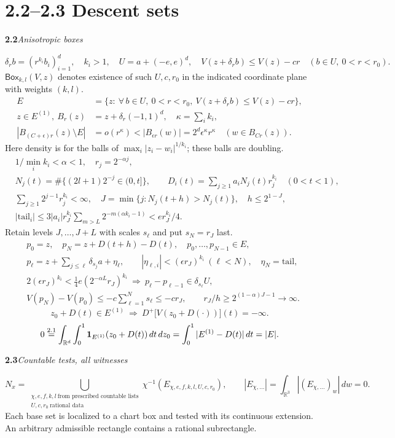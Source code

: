 \documentclass[11pt]{article}
\newcommand{\R}{\mathbb R}
\newcommand{\boxd}{\mathsf{Box}}
\newcommand{\rowhead}[2]{\par\medskip\noindent\textbf{#1}\quad\textit{#2}\par}
\newcommand{\newpart}[1]{\clearpage\section*{#1}}
\begin{document}
\newpart{2.2--2.3 \quad Descent sets}
\rowhead{2.2}{Anisotropic boxes}
\[
 \delta_r b=(r^{k_i}b_i)_{i=1}^d,\quad k_i>1,\quad
 U=a+(-e,e)^d,\quad V(z+\delta_r b)\le V(z)-cr\quad(b\in U,\ 0<r<r_0).
\]
$\boxd_{k,l}(V,z)$ denotes existence of such $U,c,r_0$ in the indicated
coordinate plane with weights $(k,l)$.
\begin{align*}
 E&=\{z:\ \forall\, b\in U,\ 0<r<r_0,\ V(z+\delta_r b)\le V(z)-cr\},\\
 z\in E^{(1)},\ B_r(z)&=z+\delta_r(-1,1)^d,\quad \kappa=\textstyle\sum_i k_i,\\
 |B_{(C+\epsilon)r}(z)\setminus E|&=o(r^\kappa)
     < |B_{\epsilon r}(w)|=2^d\epsilon^\kappa r^\kappa
                \quad(w\in B_{Cr}(z)).
\end{align*}
Here density is for the balls of $\max_i |z_i-w_i|^{1/k_i}$; these balls are doubling.
\begin{align*}
 &1/\min_i k_i<\alpha<1,\quad r_j=2^{-\alpha j},\\
 &N_j(t)=\#\{(2l+1)2^{-j}\in(0,t]\},\qquad
 D_i(t)=\sum_{j\ge1} a_i N_j(t)r_j^{k_i}\quad (0<t<1),\\
 &\sum_{j\ge1}2^{j-1}r_j^{k_i}<\infty,\quad
 J=\min\{j:N_j(t+h)>N_j(t)\},\quad h\le 2^{1-J},\\
 &|\mathrm{tail}_i|\le
  3|a_i|r_J^{k_i}\sum_{m>L}2^{-m(\alpha k_i-1)}< e r_J^{k_i}/4 .
\end{align*}
Retain levels $J,\ldots,J+L$ with scales $s_\ell$ and put $s_N=r_J$ last.
\begin{align*}
 &p_0=z,\quad p_N=z+D(t+h)-D(t),\quad p_0,\ldots,p_{N-1}\in E,\\
 &p_\ell=z+\sum_{j\le\ell}\delta_{s_j}a+\eta_\ell,\qquad
 |\eta_{\ell,i}|<(\epsilon r_J)^{k_i}\ (\ell<N),\quad \eta_N=\mathrm{tail},\\
 &2(\epsilon r_J)^{k_i}<\tfrac14 e(2^{-\alpha L}r_J)^{k_i}
 \ \Longrightarrow\ p_\ell-p_{\ell-1}\in\delta_{s_\ell}U,\\
 &V(p_N)-V(p_0)\le-c\sum_{\ell=1}^N s_\ell\le-c r_J,\qquad
 r_J/h\ge 2^{(1-\alpha)J-1}\to\infty .
\end{align*}
\[
 z_0+D(t)\in E^{(1)}\ \Longrightarrow\
 D^+\big[V(z_0+D(\cdot))\big](t)=-\infty .
\]
\[
 0\overset{2.1}{=}\int_{\R^d}\int_0^1 {\bf1}_{E^{(1)}}(z_0+D(t))\,dt\,dz_0
  =\int_0^1 |E^{(1)}-D(t)|\,dt=|E| .
\]
\rowhead{2.3}{Countable tests, all witnesses}
\[
  N_x=\bigcup_{\substack{\chi,e,f,k,l\ \text{from prescribed countable lists}\\
                          U,c,r_0\ \text{rational data}}}
         \chi^{-1}(E_{\chi,e,f,k,l,U,c,r_0}),\qquad
 |E_{\chi,\ldots}|=\int_{\R^3}|(E_{\chi,\ldots})_w|\,dw=0 .
\]
Each base set is localized to a chart box and tested with its continuous
extension. An arbitrary admissible rectangle contains a rational subrectangle.
\end{document}

